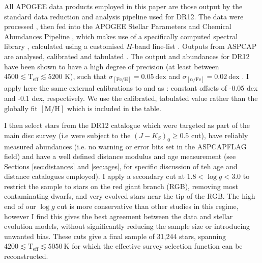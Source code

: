  All APOGEE data products employed in this paper are those output by the standard data reduction and analysis pipeline used for DR12. The data were processed \citep{2015AJ....150..173N}, then fed into the APOGEE Stellar Parameters and Chemical Abundances Pipeline \citep[ASPCAP,][]{2016AJ....151..144G}, which makes use of a specifically computed spectral library \citep{2015AJ....149..181Z}, calculated using a customised $H$-band line-list \citep{2015ApJS..221...24S}. Outputs from ASPCAP are analysed, calibrated and tabulated \citep{2015AJ....150..148H}. The output \afe{} and \feh{} abundances for DR12 have been shown to have a high degree of precision (at least between $4500 \lesssim \mathrm{T_{\mathrm{eff}}} \lesssim 5200$ K), such that $\sigma_{\mathrm{[Fe/H]}} = 0.05\ \mathrm{dex}$ and $\sigma_{\mathrm{[\alpha/Fe]}} = 0.02\ \mathrm{dex}$ \citep{2016ApJ...823...30B}. I apply here the same external calibrations to \afe{} and \feh{} as \citet{2016ApJ...823...30B}: constant offsets of -0.05 dex and -0.1 dex, respectively. We use the calibrated, tabulated \feh{} value rather than the globally fit $\mathrm{[M/H]}$ which is included in the table.

I then select stars from the DR12 catalogue which were targeted as part of the main disc survey (i.e were subject to the $(J-K_S)_0 \geq 0.5$ cut), have reliably measured abundances (i.e. no warning or error bits set in the ASPCAPFLAG field) and have a well defined distance modulus and age measurement (see Sections \ref{sec:distances} and \ref{sec:ages}, for specific discussion of teh age and distance catalogues employed). I apply a secondary cut at $1.8 < \log{g} < 3.0$ to restrict the sample to stars on the red giant branch (RGB), removing most contaminating dwarfs, and very evolved stars near the tip of the RGB. The high end of our $\log{g}$ cut is more conservative than other studies in this regime, however I find this gives the best agreement between the data and stellar evolution models, without significantly reducing the sample size or introducing unwanted bias. These cuts give a final sample of 31,244 stars, spanning $4200 \lesssim \mathrm{T_{\mathrm{eff}}} \lesssim  5050\ \mathrm{K}$ for which the effective survey selection function can be reconstructed.

